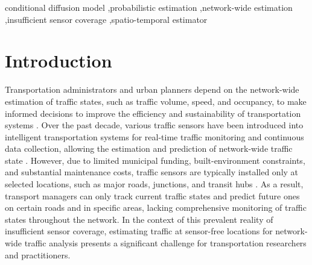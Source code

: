 \documentclass[a4paper,fleqn,12pt]{cas-sc}
\begin{document}
\begin{keywords}
conditional diffusion model \sep probabilistic estimation \sep network-wide estimation \sep insufficient sensor coverage \sep spatio-temporal estimator
\end{keywords}


\maketitle
\setlength{\parindent}{15pt}
\setlength{\parskip}{0.1in}
\linenumbers

\section{Introduction}\label{sec:introduction}
Transportation administrators and urban planners depend on the network-wide estimation of traffic states, such as traffic volume, speed, and occupancy, to make informed decisions to improve the efficiency and sustainability of transportation systems \citep{cheng2020examining, lei2020inferring}. Over the past decade, various traffic sensors have been introduced into intelligent transportation systems for real-time traffic monitoring and continuous data collection, allowing the estimation and prediction of network-wide traffic state \citep{lei2021minimum, xu2022integrating, cheng2023comparison}. However, due to limited municipal funding, built-environment constraints, and substantial maintenance costs, traffic sensors are typically installed only at selected locations, such as major roads, junctions, and transit hubs \citep{zhang2020network}. As a result, transport managers can only track current traffic states and predict future ones on certain roads and in specific areas, lacking comprehensive monitoring of traffic states throughout the network. In the context of this prevalent reality of insufficient sensor coverage, estimating traffic at sensor-free locations for network-wide traffic analysis presents a significant challenge for transportation researchers and practitioners. 
\end{document}
